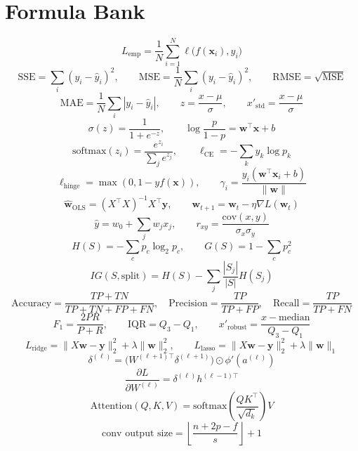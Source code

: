 \documentclass[10pt,twocolumn]{article}
\newcommand{\x}{\mathbf{x}}
\newcommand{\y}{\mathbf{y}}
\newcommand{\w}{\mathbf{w}}
\begin{document}
\section{Formula Bank}
\[
L_{\mathrm{emp}}=\frac{1}{N}\sum_{i=1}^N \ell\big(f(\x_i),y_i\big)
\]
\[
\mathrm{SSE}=\sum_i (y_i-\hat y_i)^2,
\qquad
\mathrm{MSE}=\frac{1}{N}\sum_i (y_i-\hat y_i)^2,
\qquad
\mathrm{RMSE}=\sqrt{\mathrm{MSE}}
\]
\[
\mathrm{MAE}=\frac{1}{N}\sum_i |y_i-\hat y_i|,
\qquad
z=\frac{x-\mu}{\sigma},
\qquad
x'_{\mathrm{std}}=\frac{x-\mu}{\sigma}
\]
\[
\sigma(z)=\frac{1}{1+e^{-z}},
\qquad
\log\frac{p}{1-p}=\w^\top\x+b
\]
\[
\mathrm{softmax}(z_i)=\frac{e^{z_i}}{\sum_j e^{z_j}},
\qquad
\ell_{\mathrm{CE}}=-\sum_k y_k\log p_k
\]
\[
\ell_{\mathrm{hinge}}=\max(0,1-yf(\x)),
\qquad
\gamma_i=\frac{y_i(\w^\top\x_i+b)}{\|\w\|}
\]
\[
\hat{\w}_{\mathrm{OLS}}=(X^\top X)^{-1}X^\top\y,
\qquad
\w_{t+1}=\w_t-\eta\nabla L(\w_t)
\]
\[
\hat y = w_0+\sum_j w_j x_j,
\qquad
r_{xy}=\frac{\mathrm{cov}(x,y)}{\sigma_x\sigma_y}
\]
\[
H(S)=-\sum_c p_c\log_2 p_c,
\qquad
G(S)=1-\sum_c p_c^2
\]
\[
IG(S,\text{split}) = H(S)-\sum_j \frac{|S_j|}{|S|}H(S_j)
\]
\[
\text{Accuracy}=\frac{TP+TN}{TP+TN+FP+FN},
\quad
\text{Precision}=\frac{TP}{TP+FP},
\quad
\text{Recall}=\frac{TP}{TP+FN}
\]
\[
F_1=\frac{2PR}{P+R},
\qquad
\text{IQR}=Q_3-Q_1,
\qquad
x'_{\mathrm{robust}}=\frac{x-\mathrm{median}}{Q_3-Q_1}
\]
\[
L_{\mathrm{ridge}}=\|X\w-\y\|_2^2+\lambda\|\w\|_2^2,
\qquad
L_{\mathrm{lasso}}=\|X\w-\y\|_2^2+\lambda\|\w\|_1
\]
\[
\delta^{(\ell)} = \big(W^{(\ell+1)\top}\delta^{(\ell+1)}\big)\odot \phi'(a^{(\ell)})
\]
\[
\frac{\partial L}{\partial W^{(\ell)}} = \delta^{(\ell)} h^{(\ell-1)\top}
\]
\[
\mathrm{Attention}(Q,K,V)=\mathrm{softmax}\!\left(\frac{QK^\top}{\sqrt{d_k}}\right)V
\]
\[
\text{conv output size} = \left\lfloor\frac{n+2p-f}{s}\right\rfloor+1
\]
\end{document}
